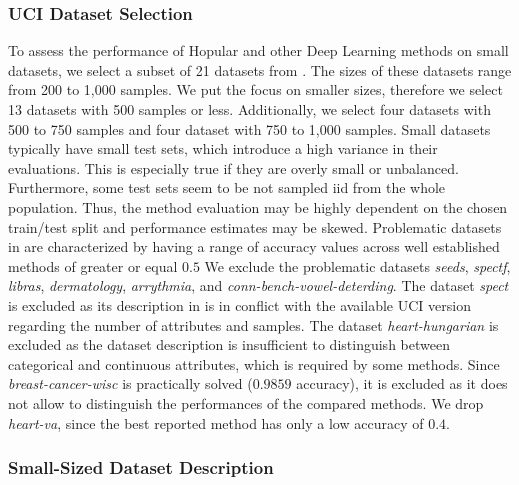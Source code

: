 \documentclass{article}
\theoremstyle{plain}
\theoremstyle{definition}
\theoremstyle{remark}
\begin{document}
\subsubsection{UCI Dataset Selection}
To assess the performance of Hopular and other Deep Learning methods 
on small datasets, 
we select a subset of 21 datasets from \citep{Klambauer:17}. 
The sizes of these datasets range from 200 to 1,000 samples.
We put the focus on smaller sizes, therefore we select
13 datasets with 500 samples or less.
Additionally, we select four datasets with 500 to 750 samples and 
four dataset with 750 to 1,000 samples. 
Small datasets typically have small test sets, 
which introduce a high variance in their evaluations.
This is especially true if they are overly small or unbalanced.
Furthermore, some test sets seem to be not sampled iid from the whole population. 
Thus, the method evaluation may be highly dependent on the chosen train/test split and
performance estimates may be skewed.
Problematic datasets in \citep{Klambauer:17} are characterized
by having a range of accuracy values across well established methods of greater or equal $0.5$
We exclude the problematic datasets 
{\em seeds}, {\em spectf}, {\em libras}, {\em dermatology}, {\em arrythmia}, 
and {\em conn-bench-vowel-deterding}.
The dataset {\em spect} is excluded as its description in \citep{Fernandez:14} 
is in conflict with the available UCI version regarding the number of attributes and samples.
The dataset
{\em heart-hungarian} is excluded as the dataset description 
is insufficient to distinguish between categorical and continuous attributes,
which is required by some methods.
Since {\em breast-cancer-wisc} is practically solved ($0.9859$ accuracy), it is excluded as
it does not allow to distinguish the performances of the compared methods.
We drop {\em heart-va}, 
since the best reported method has only a low accuracy of $0.4$.

\pagebreak{}
\subsubsection{Small-Sized Dataset Description}
\end{document}
